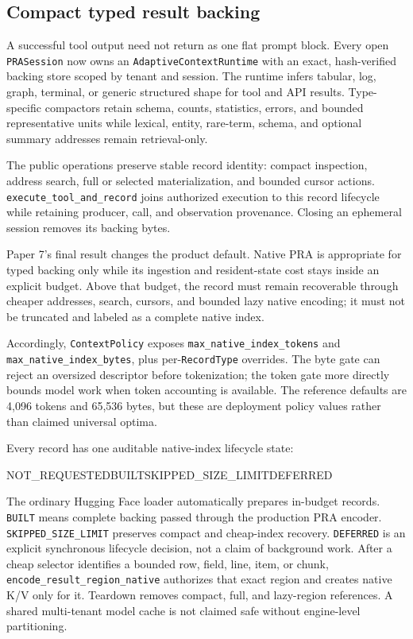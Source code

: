 \documentclass[11pt]{article}
\begin{document}
\subsection{Compact typed result backing}

A successful tool output need not return as one flat prompt block.  Every open
\texttt{PRASession} now owns an \texttt{AdaptiveContextRuntime} with an exact,
hash-verified backing store scoped by tenant and session.  The runtime infers
tabular, log, graph, terminal, or generic structured shape for tool and API
results.  Type-specific compactors retain schema, counts, statistics, errors,
and bounded representative units while lexical, entity, rare-term, schema, and
optional summary addresses remain retrieval-only.

The public operations preserve stable record identity: compact inspection,
address search, full or selected materialization, and bounded cursor actions.
\texttt{execute\_tool\_and\_record} joins authorized execution to this record
lifecycle while retaining producer, call, and observation provenance.  Closing
an ephemeral session removes its backing bytes.

Paper 7's final result changes the product default. Native PRA is appropriate
for typed backing only while its ingestion and resident-state cost stays inside
an explicit budget. Above that budget, the record must remain recoverable
through cheaper addresses, search, cursors, and bounded lazy native encoding;
it must not be truncated and labeled as a complete native index.

Accordingly, \texttt{ContextPolicy} exposes
\texttt{max\_native\_index\_tokens} and
\texttt{max\_native\_index\_bytes}, plus per-\texttt{RecordType}
overrides. The byte gate can reject an oversized descriptor before tokenization;
the token gate more directly bounds model work when token accounting is
available. The reference defaults are 4,096 tokens and 65,536 bytes, but these
are deployment policy values rather than claimed universal optima.

Every record has one auditable native-index lifecycle state:
\begin{center}
\small\ttfamily
NOT\_REQUESTED\quad BUILT\quad SKIPPED\_SIZE\_LIMIT\quad DEFERRED
\end{center}
The ordinary Hugging Face loader automatically prepares in-budget records.
\texttt{BUILT} means complete backing passed through the production PRA encoder.
\texttt{SKIPPED\_SIZE\_LIMIT} preserves compact and cheap-index recovery.
\texttt{DEFERRED} is an explicit synchronous lifecycle decision, not a claim of
background work. After a cheap selector identifies a bounded row, field, line,
item, or chunk, \texttt{encode\_result\_region\_native} authorizes that exact
region and creates native K/V only for it. Teardown removes compact, full, and
lazy-region references. A shared multi-tenant model cache is not claimed safe
without engine-level partitioning.
\end{document}
